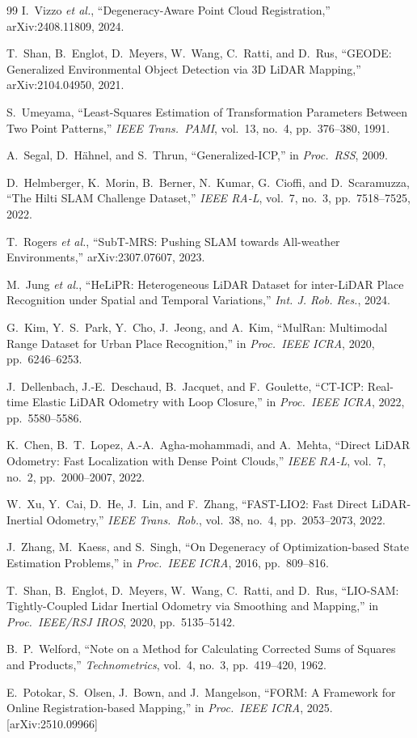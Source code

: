 \documentclass[journal,letterpaper,10pt]{IEEEtran}
\newcommand{\etal}{\textit{et al.}}
\begin{document}
\begin{thebibliography}{99}
I.~Vizzo \etal,
``Degeneracy-Aware Point Cloud Registration,''
arXiv:2408.11809, 2024.

T.~Shan, B.~Englot, D.~Meyers, W.~Wang, C.~Ratti, and D.~Rus,
``GEODE: Generalized Environmental Object Detection via 3D LiDAR Mapping,''
arXiv:2104.04950, 2021.

S.~Umeyama,
``Least-Squares Estimation of Transformation Parameters Between Two Point
Patterns,''
\textit{IEEE Trans.\ PAMI}, vol.~13, no.~4, pp.~376--380, 1991.

A.~Segal, D.~H\"{a}hnel, and S.~Thrun,
``Generalized-ICP,''
in \textit{Proc.\ RSS}, 2009.

D.~Helmberger, K.~Morin, B.~Berner, N.~Kumar, G.~Cioffi, and D.~Scaramuzza,
``The Hilti SLAM Challenge Dataset,''
\textit{IEEE RA-L}, vol.~7, no.~3, pp.~7518--7525, 2022.

T.~Rogers \etal,
``SubT-MRS: Pushing SLAM towards All-weather Environments,''
arXiv:2307.07607, 2023.

M.~Jung \etal,
``HeLiPR: Heterogeneous LiDAR Dataset for inter-LiDAR Place Recognition
under Spatial and Temporal Variations,''
\textit{Int. J. Rob. Res.}, 2024.

G.~Kim, Y.~S.~Park, Y.~Cho, J.~Jeong, and A.~Kim,
``MulRan: Multimodal Range Dataset for Urban Place Recognition,''
in \textit{Proc.\ IEEE ICRA}, 2020, pp.~6246--6253.

J.~Dellenbach, J.-E.~Deschaud, B.~Jacquet, and F.~Goulette,
``CT-ICP: Real-time Elastic LiDAR Odometry with Loop Closure,''
in \textit{Proc.\ IEEE ICRA}, 2022, pp.~5580--5586.

K.~Chen, B.~T.~Lopez, A.-A.~Agha-mohammadi, and A.~Mehta,
``Direct LiDAR Odometry: Fast Localization with Dense Point Clouds,''
\textit{IEEE RA-L}, vol.~7, no.~2, pp.~2000--2007, 2022.

W.~Xu, Y.~Cai, D.~He, J.~Lin, and F.~Zhang,
``FAST-LIO2: Fast Direct LiDAR-Inertial Odometry,''
\textit{IEEE Trans.\ Rob.}, vol.~38, no.~4, pp.~2053--2073, 2022.

J.~Zhang, M.~Kaess, and S.~Singh,
``On Degeneracy of Optimization-based State Estimation Problems,''
in \textit{Proc.\ IEEE ICRA}, 2016, pp.~809--816.

T.~Shan, B.~Englot, D.~Meyers, W.~Wang, C.~Ratti, and D.~Rus,
``LIO-SAM: Tightly-Coupled Lidar Inertial Odometry via Smoothing and
Mapping,''
in \textit{Proc.\ IEEE/RSJ IROS}, 2020, pp.~5135--5142.

B.~P.~Welford,
``Note on a Method for Calculating Corrected Sums of Squares and Products,''
\textit{Technometrics}, vol.~4, no.~3, pp.~419--420, 1962.

E.~Potokar, S.~Olsen, J.~Bown, and J.~Mangelson,
``FORM: A Framework for Online Registration-based Mapping,''
in \textit{Proc.\ IEEE ICRA}, 2025. [arXiv:2510.09966]

\end{thebibliography}
\end{document}
